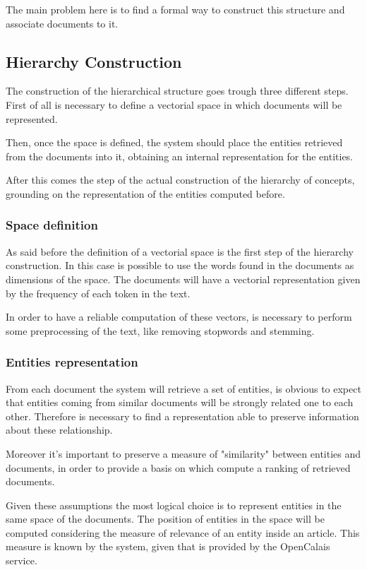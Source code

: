 \documentclass{acm_proc_article-sp-sigmod07}
\begin{document}
The main problem here is to find a formal way to construct this
structure and associate documents to it. 

\subsection{Hierarchy Construction}
The construction of the hierarchical structure goes trough three different
steps. First of all is necessary to define a vectorial space in which
documents will be represented.

Then, once the space is defined, the system should place the entities
retrieved from the documents into it, obtaining an internal representation
for the entities.

After this comes the step of the actual construction of the hierarchy of
concepts, grounding on the representation of the entities computed before.

\subsubsection{Space definition}
As said before the definition of a vectorial space is the first step of
the hierarchy construction. In this case is possible to use the words
found in the documents as dimensions of the space.
The documents will have a vectorial representation given by the frequency
of each token in the text.

In order to have a reliable computation of these vectors, is necessary to
perform some preprocessing of the text, like removing stopwords and
stemming.

\subsubsection{Entities representation}
From each document the system will retrieve a set of entities, is obvious
to expect that entities coming from similar documents will be strongly
related one to each other.
Therefore is necessary to find a representation able to preserve
information about these relationship. 

Moreover it's important to preserve a measure of "similarity" between
entities and documents, in order to provide a basis on which compute a
ranking of retrieved documents.

Given these assumptions the most logical choice is to represent entities
in the same space of the documents. 
The position of entities in the space will be computed considering the
measure of relevance of an entity inside an article.
This measure is known by the system, given that is provided by the
OpenCalais service.
\end{document}
